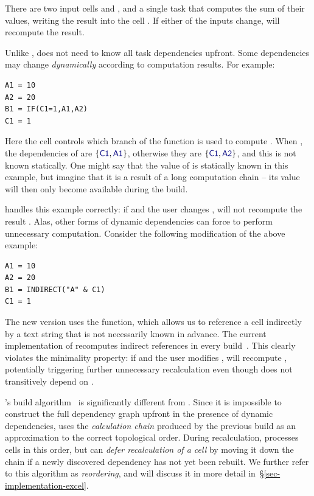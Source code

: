 \noindent
There are two input cells  and , and a single task that computes
the sum of their values, writing the result into the cell . If either of
the inputs change, \Excel will recompute the result.

Unlike \Make, \Excel does not need to know all task dependencies upfront. Some
dependencies may change \emph{dynamically} according to computation results. For
example:

\vspace{1mm}
\begin{verbatim}
A1 = 10
A2 = 20
B1 = IF(C1=1,A1,A2)
C1 = 1
\end{verbatim}
\vspace{1mm}

\noindent
Here the cell  controls which branch of the  function is used
to compute . When , the dependencies of  are
$\{\cmd{C1},\cmd{A1}\}$, otherwise they are $\{\cmd{C1},\cmd{A2}\}$, and this is
not known statically. One might say that the value of  is statically
known in this example, but imagine that it is a result of a long computation
chain -- its value will then only become available during the build.

\Excel handles this example correctly: if  and the user changes
, \Excel will not recompute the result . Alas, other forms of
dynamic dependencies can force \Excel to perform unnecessary computation.
Consider the following modification of the above example:

\vspace{1mm}
\begin{verbatim}
A1 = 10
A2 = 20
B1 = INDIRECT("A" & C1)
C1 = 1
\end{verbatim}
\vspace{1mm}

\noindent
The new version uses the  function, which allows us to reference a
cell indirectly by a text string that is not necessarily known in advance. The
current implementation of \Excel recomputes indirect references in every
build~\cite{excel_recalc}. This clearly violates the minimality property: if
 and the user modifies , \Excel will recompute ,
potentially triggering further unnecessary recalculation even though 
does not transitively depend on .

\Excel's build algorithm~\cite{excel_recalc} is significantly different from
\Make. Since it is impossible to construct the full dependency graph upfront in
the presence of dynamic dependencies, \Excel uses the \emph{calculation chain}
produced by the previous build as an approximation to the correct topological
order. During recalculation, \Excel processes cells in this order, but can
\emph{defer recalculation of a cell} by moving it down the chain if a newly
discovered dependency has not yet been rebuilt. We further refer to this
algorithm as \emph{reordering}, and will discuss it in more detail
in~\S\ref{sec-implementation-excel}.

